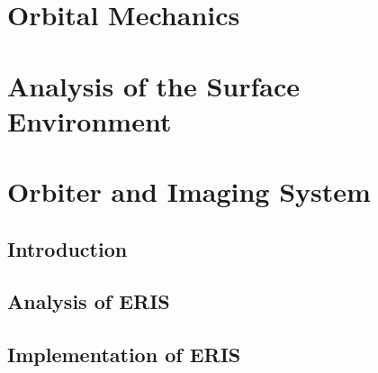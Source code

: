 \chapter{Orbital Mechanics}
\newpage
\listoftodos
\newpage


\chapter{Analysis of the Surface Environment}%

\chapter{Orbiter and Imaging System}
\section{Introduction}

\section{Analysis of ERIS}

\section{Implementation of ERIS}

